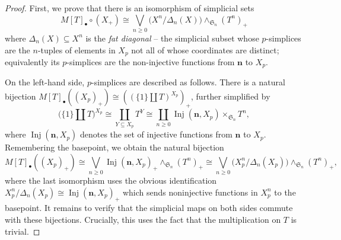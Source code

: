\documentclass[10pt,a4paper]{amsart}
\newcommand{\SymGroup}[1][n]{\mathfrak{S}_{#1}}
\begin{document}
\begin{proof}

First, we prove that there is an isomorphism of simplicial sets 
\[
    M[T]_{\bullet}\circ (X_+) \cong \bigvee_{n\geq 0}{\Big(X^n/{\Delta_n(X)}\Big) \wedge_{\SymGroup}(T^n)_+}
\]
where $\Delta_n(X) \subseteq X^n$ is the \emph{fat diagonal} -- the simplicial subset whose $p$-simplices are the $n$-tuples of elements in $X_p$ not all of whose coordinates are distinct; equivalently its $p$-simplices are the non-injective functions from $\bm{n}$ to $X_p$.%

On the left-hand side, $p$-simplices are described as follows. There is a natural bijection $M[T]_{\bullet}((X_p)_+) \cong \left((\{1\}\coprod T)^{X_p}\right)_+$, further simplified by
\begin{equation}\label{eq:from functor to configurations}
\big(\{1\}\coprod T\big)^{X_p} \cong \coprod_{Y\subseteq X_p} T^Y \cong \coprod_{n\geq 0}\operatorname{Inj}(\bm{n},X_p) \times_{\SymGroup} T^n,
\end{equation}
where $\operatorname{Inj}(\bm{n},X_p)$ denotes the set of injective functions from $\bm{n}$ to $X_p$. Remembering the basepoint, we obtain the natural bijection
\[
    M[T]_{\bullet}((X_p)_+) \cong \bigvee_{n\geq 0}\operatorname{Inj}(\bm{n},X_p)_+\wedge_{\SymGroup}(T^n)_+ \cong \bigvee_{n\geq 0}\Big(X_p^n/{\Delta_n(X_p)}\Big)\wedge_{\SymGroup}(T^n)_+,
\]
where the last isomorphism uses the obvious identification $X_p^n/\Delta_n(X_p) \cong \operatorname{Inj}(\bm{n},X_p)_+$
which sends noninjective functions in $X_p^n$ to the basepoint. It remains to verify that the simplicial maps on both sides commute with these bijections. Crucially, this uses the fact that the multiplication on $T$ is trivial.



\end{proof}
\end{document}
